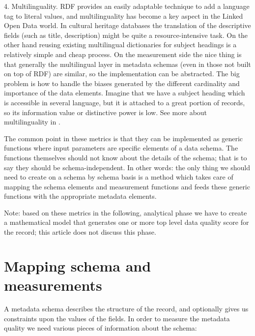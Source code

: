 4. Multilinguality. RDF provides an easily adaptable technique to add a language tag to literal values, and multilinguality has become a key aspect in the Linked Open Data world. In cultural heritage databases the translation of the descriptive fields (such as title, description) might be quite a resource-intensive task. On the other hand reusing existing multilingual dictionaries for subject headings is a relatively simple and cheap process. On the measurement side the nice thing is that generally the multilingual layer in metadata schemas (even in those not built on top of RDF) are similar, so the implementation can be abstracted. The big problem is how to handle the biases generated by the different cardinality and importance of the data elements. Imagine that we have a subject heading which is accessible in several language, but it is attached to a great portion of records, so its information value or distinctive power is low. See more about multilinguality in \cite{stiller-kiraly2017}.

The common point in these metrics is that they can be implemented as generic functions where input parameters are specific elements of a data schema. The functions themselves should not know about the details of the schema; that is to say they should be schema-independent. In other words: the only thing we should need to create on a schema by schema basis is a method which takes care of mapping the schema elements and measurement functions and feeds these generic functions with the appropriate metadata elements.

Note: based on these metrics in the following, analytical phase we have to create a mathematical model that generates one or more top level data quality score for the record; this article does not discuss this phase.

\section{Mapping schema and measurements}

A metadata schema describes the structure of the record, and optionally gives us constraints upon the values of the fields. In order to measure the metadata quality we need various pieces of information about the schema:


